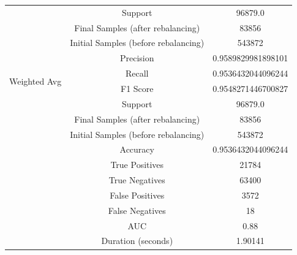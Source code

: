 \begin{longtable}{|c|c|c|}
 & Support & 96879.0 \\
 & Final Samples (after rebalancing) & 83856 \\
 & Initial Samples (before rebalancing) & 543872 \\
\hline
\multirow{4}{*}{Weighted Avg} & Precision & 0.9589829981898101 \\
 & Recall & 0.9536432044096244 \\
 & F1 Score & 0.9548271446700827 \\
 & Support & 96879.0 \\
 & Final Samples (after rebalancing) & 83856 \\
 & Initial Samples (before rebalancing) & 543872 \\
\hline
& Accuracy & 0.9536432044096244 \\ \hline
& True Positives & 21784 \\ \hline
& True Negatives & 63400 \\ \hline
& False Positives & 3572 \\ \hline
& False Negatives & 18 \\ \hline
& AUC & 0.88 \\ \hline
& Duration (seconds) & 1.90141 \\ \hline
\end{longtable}


